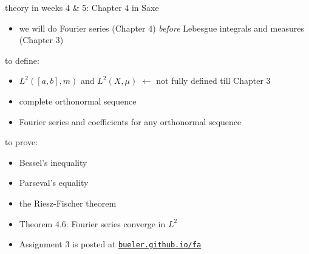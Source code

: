 \documentclass[10pt,
               svgnames,
               hyperref={colorlinks,
                         citecolor=DeepPink4,
                         linkcolor=FireBrick,
                         urlcolor=blue},
               usepdftitle=false]{beamer}
\begin{document}
\begin{frame}{theory in weeks 4 \& 5: Chapter 4 in Saxe}

\begin{itemize}
\item we will do Fourier series (Chapter 4) \emph{before} Lebesgue integrals and measures (Chapter 3)
\end{itemize}

\begin{block}{to define:}
\begin{itemize}
\item $L^2([a,b],m)$ and $L^2(X,\mu)$ \hfill \alert{$\longleftarrow$ not fully defined till Chapter 3}
\item complete orthonormal sequence
\item Fourier series and coefficients for any orthonormal sequence
\end{itemize}
\end{block}

\begin{block}{to prove:}
\begin{itemize}
\item Bessel's inequality
\item Parseval's equality
\item the Riesz-Fischer theorem
\item Theorem 4.6: Fourier series converge in $L^2$
\end{itemize}
\end{block}

\begin{itemize}
\item Assignment 3 is posted at \quad  \href{https://bueler.github.io/fa/index.html}{\texttt{bueler.github.io/fa}}
\end{itemize}
\end{frame}
\end{document}
